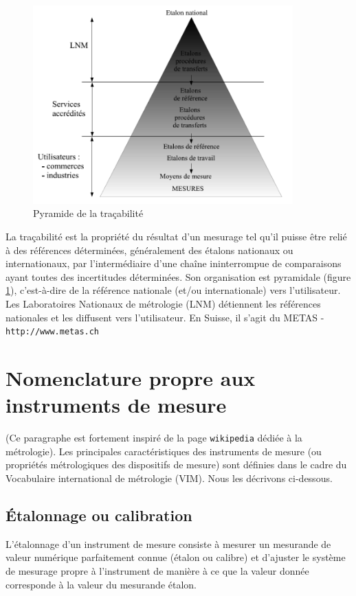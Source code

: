 \begin{figure}
   \centering
   \vspace{-5mm}
   \includegraphics[width=10cm]{assets/figures/pyramideTracabilite.pdf}
   \caption{Pyramide de la traçabilité}
   \label{fig:pyr}
\end{figure}
La traçabilité est la propriété du résultat d'un mesurage tel qu'il puisse être relié à des références déterminées, généralement des étalons nationaux ou internationaux, par l'intermédiaire d'une chaîne ininterrompue de comparaisons ayant toutes des incertitudes déterminées. Son organisation est pyramidale (figure \ref{fig:pyr}), c'est-à-dire de la référence nationale (et/ou internationale) vers l'utilisateur. Les Laboratoires Nationaux de métrologie (LNM) détiennent les références nationales et les diffusent vers l'utilisateur. En Suisse, il s'agit du METAS - \texttt{http://www.metas.ch}

\section{Nomenclature propre aux instruments de mesure}

(Ce paragraphe est fortement inspiré de la page \texttt{wikipedia} dédiée à la métrologie). Les principales caractéristiques des instruments de mesure (ou propriétés métrologiques des dispositifs de mesure) sont définies dans le cadre du Vocabulaire international de métrologie (VIM). Nous les décrivons ci-dessous.

\subsection{Étalonnage ou calibration}

L'étalonnage d'un instrument de mesure consiste à mesurer un mesurande de valeur numérique parfaitement connue (étalon ou calibre) et d'ajuster le système de mesurage propre à l'instrument de manière à ce que la valeur donnée corresponde à la valeur du mesurande étalon.

